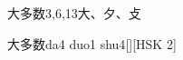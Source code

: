 \begin{entry}{大多数}{3,6,13}{⼤、⼣、⽁}
  \begin{phonetics}{大多数}{da4 duo1 shu4}[][HSK 2]
  \end{phonetics}
\end{entry}
